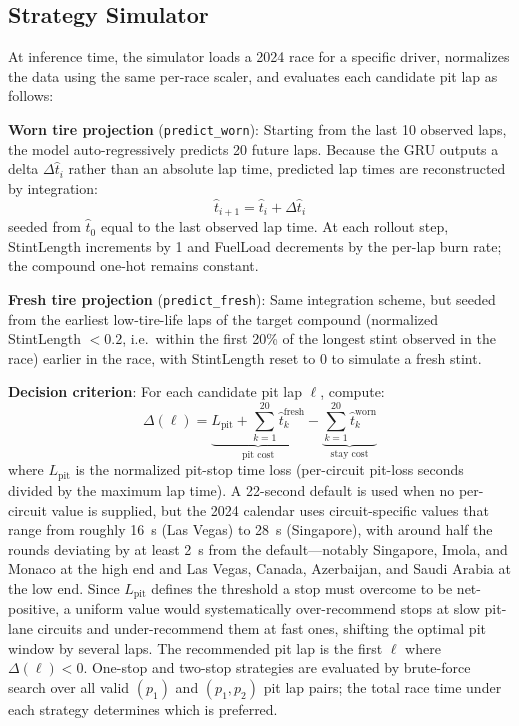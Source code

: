 \subsection{Strategy Simulator}

At inference time, the simulator loads a 2024 race for a specific driver, normalizes the data using the same per-race scaler, and evaluates each 
candidate pit lap as follows:

\textbf{Worn tire projection} (\texttt{predict\_worn}): Starting from the last 10 observed laps, the model auto-regressively predicts 20 future laps. Because the GRU outputs a delta $\Delta\hat{t}_i$ rather than an absolute lap time, predicted lap times are reconstructed by integration:
\begin{equation}
\hat{t}_{i+1} = \hat{t}_i + \Delta\hat{t}_i
\end{equation}
seeded from $\hat{t}_0$ equal to the last observed lap time. At each rollout step, StintLength increments by 1 and FuelLoad decrements by the per-lap burn rate; the compound one-hot remains constant.

\textbf{Fresh tire projection} (\texttt{predict\_fresh}): Same integration scheme, but seeded from the earliest low-tire-life laps of the target compound (normalized StintLength $< 0.2$, i.e.\ within the first 20\% of the longest stint observed in the race) earlier in the race, with StintLength reset to 0 to simulate a fresh stint.

\textbf{Decision criterion}: For each candidate pit lap $\ell$, compute:
\begin{equation}
\Delta(\ell) = \underbrace{L_\text{pit} + \sum_{k=1}^{20} \hat{t}_k^\text{fresh}}_{\text{pit cost}} - \underbrace{\sum_{k=1}^{20} \hat{t}_k^\text{worn}}_{\text{stay cost}}
\end{equation}
where $L_\text{pit}$ is the normalized pit-stop time loss (per-circuit pit-loss seconds divided by the maximum lap time). A 22-second default is used when no per-circuit value is supplied, but the 2024 calendar uses circuit-specific values that range from roughly 16~s (Las Vegas) to 28~s (Singapore), with around half the rounds deviating by at least 2~s from the default---notably Singapore, Imola, and Monaco at the high end and Las Vegas, Canada, Azerbaijan, and Saudi Arabia at the low end.
Since $L_\text{pit}$ defines the threshold a stop must overcome to be net-positive, a uniform value would systematically over-recommend stops at slow pit-lane circuits and under-recommend them at fast ones, shifting the optimal pit window by several laps.
 The recommended pit lap is the first $\ell$ where $\Delta(\ell) < 0$. One-stop and two-stop strategies are evaluated by brute-force search over all valid $(p_1)$ and $(p_1, p_2)$ pit lap pairs; the total race time under each strategy determines which is preferred.
